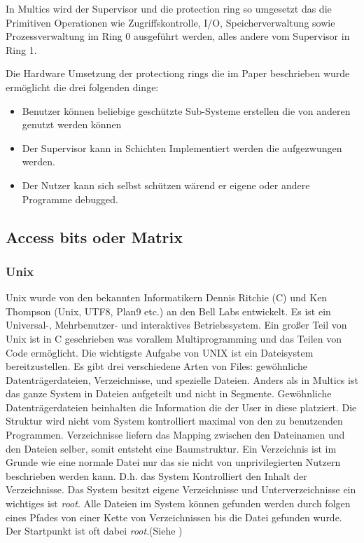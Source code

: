 \documentclass[9pt,technote]{IEEEtran}
\begin{document}
    In Multics wird der Supervisor und die protection ring so umgesetzt das die Primitiven Operationen wie Zugriffskontrolle, I/O, Speicherverwaltung sowie
    Prozessverwaltung im Ring 0 ausgef\"uhrt werden, alles andere vom Supervisor in Ring 1.
    
    Die Hardware Umsetzung der protectiong rings die im Paper \cite{inproc:protec-rings} beschrieben wurde erm\"oglicht die drei folgenden dinge:
    \begin{itemize}
      \item Benutzer k\"onnen beliebige gesch\"utzte Sub-Systeme erstellen die von anderen genutzt werden k\"onnen
      \item Der Supervisor kann in Schichten Implementiert werden die aufgezwungen werden.
      \item Der Nutzer kann sich selbst sch\"utzen w\"arend er eigene oder andere Programme debugged.
    \end{itemize}
    
    \subsection{Access bits oder Matrix} \label{subsec:access}
      \subsubsection{Unix}
		    Unix wurde von den bekannten Informatikern Dennis Ritchie (C) und Ken Thompson (Unix, UTF8, Plan9 etc.) an den Bell Labs entwickelt.
		    Es ist ein Universal-, Mehrbenutzer- und interaktives Betriebssystem. Ein gro\ss er Teil von Unix ist in C geschrieben was vorallem Multiprogramming
		    und das Teilen von Code erm\"oglicht. Die wichtigste Aufgabe von UNIX ist ein Dateisystem bereitzustellen. Es gibt drei verschiedene Arten von Files:
		    gew\"ohnliche Datentr\"agerdateien, Verzeichnisse, und spezielle Dateien. Anders als in Multics ist das ganze System in Dateien aufgeteilt und nicht in
		    Segmente. Gew\"ohnliche Datentr\"agerdateien beinhalten die Information die der User in diese platziert. 
		    Die Struktur wird nicht vom System kontrolliert maximal
		    von den zu benutzenden Programmen. Verzeichnisse liefern das Mapping zwischen den Dateinamen und den Dateien selber, somit entsteht eine Baumstruktur.
		    Ein Verzeichnis ist im Grunde wie eine normale Datei nur das sie nicht von unprivilegierten Nutzern beschrieben werden kann. D.h. das System Kontrolliert den
		    Inhalt der Verzeichnisse. Das System besitzt eigene Verzeichnisse und Unterverzeichnisse ein wichtiges ist \textit{root}.
		     Alle Dateien im System k\"onnen gefunden 
		    werden durch folgen eines Pfades von einer Kette von Verzeichnissen bis die Datei gefunden wurde. 
		    Der Startpunkt ist oft dabei \textit{root}.(Siehe \cite[S. 366]{inproc:unix})
		    
\end{document}
